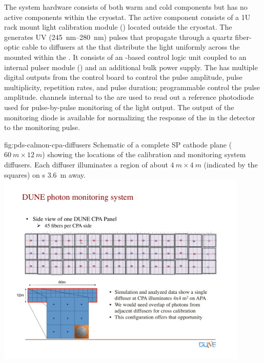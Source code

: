 The system hardware consists of both warm and cold components but has no active components within the cryostat. The active component consists of a 1U rack mount light calibration module () located outside the cryostat. The  generates UV (\SIrange{245}{280}{nm}) pulses that propagate through a quartz fiber-optic cable to diffusers at the  that distribute the light uniformly across the  mounted within the . 
It consists of an -based control logic unit coupled to an internal  pulser module () and an additional bulk power supply. 
The  has multiple digital outputs from the control board to control the pulse amplitude, pulse multiplicity, repetition rates, and pulse duration; programmable  control the  pulse amplitude.  channels internal to the  are used to read out a reference photodiode used for pulse-by-pulse monitoring of the  light output. The output of the monitoring diode is available for normalizing the response of the  in the detector to the monitoring pulse. 


\begin{dunefigure}
 {fig:pds-calmon-cpa-diffusers}
 {Schematic of a complete SP cathode plane ($\SI{60}{m}\times\SI{12}{m}$) showing the locations of the calibration and monitoring system diffusers. Each diffuser illuminates a region of about $\SI{4}{m}\times\SI{4}{m}$ (indicated by the squares) on s \SI{3.6}{m} away.}
\includegraphics[angle=0,width=0.9\textwidth]{graphics/pds-calibration-cpa}
\end{dunefigure}

